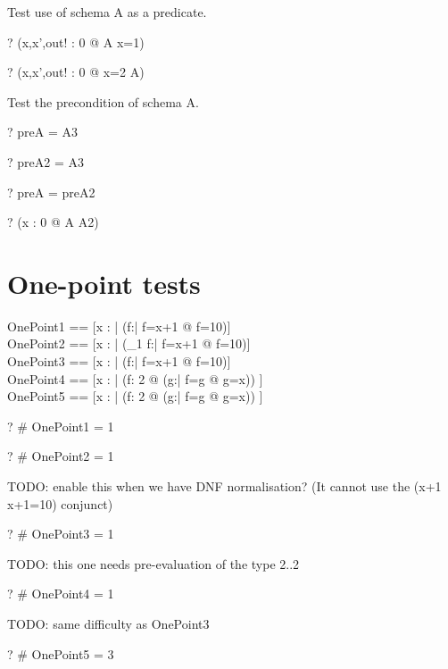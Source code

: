 \documentclass{article}
\begin{document}
Test use of schema A as a predicate.
\begin{zed} \vdash?
  (\exists x,x',out! : 0  @ A \land x=1)
\end{zed}
\begin{zed} \vdash?
  \lnot (\exists x,x',out! : 0  @ x=2 \land A)
\end{zed}

Test the precondition of schema A.
\begin{zed} \vdash? preA = A3 \end{zed}
\begin{zed} \vdash? preA2 = A3 \end{zed}
\begin{zed} \vdash? preA = preA2 \end{zed}

\begin{zed} \vdash? (\forall x : 0  @ \pre A \iff A2) \end{zed}

\section{One-point tests}
\begin{zed}
  OnePoint1 == [x : \nat | (\exists   f:\nat | f=x+1 @ f=10)] \\
  OnePoint2 == [x : \nat | (\exists_1 f:\nat | f=x+1 @ f=10)] \\
  OnePoint3 == [x : \nat | (\forall   f:\nat | f=x+1 @ f=10)] \\
  OnePoint4 == [x : \nat | (\forall f: 2  @
                               (\exists g:\nat | f=g @ g=x)) ] \\
  OnePoint5 == [x : \nat | (\exists f: 2  @
                               (\forall g:\nat | f=g @ g=x)) ]
\end{zed}

\begin{zed} \vdash? \# OnePoint1 = 1 \end{zed}
\begin{zed} \vdash? \# OnePoint2 = 1 \end{zed}
TODO: enable this when we have DNF normalisation?
(It cannot use the (x+1 \in \nat \implies x+1=10) conjunct)
\begin{zed} \vdash? \# OnePoint3 = 1 \end{zed}
TODO: this one needs pre-evaluation of the type 2..2
\begin{zed} \vdash? \# OnePoint4 = 1 \end{zed}
TODO: same difficulty as OnePoint3
\begin{zed} \vdash? \# OnePoint5 = 3 \end{zed}
\end{document}
